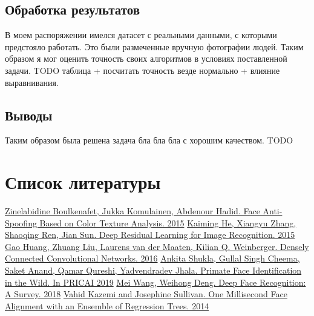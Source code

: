 \documentclass[a4paper,14pt]{extarticle}
\begin{document}
    \subsection{Обработка результатов}
    В моем распоряжении имелся датасет с реальными данными, с которыми предстояло работать. Это были размеченные вручную фотографии людей. Таким образом я мог оценить точность своих алгоритмов в условиях поставленной задачи. TODO таблица + посчитать точность везде нормально + влияние выравнивания.

    \subsection{Выводы}
    Таким образом была решена задача бла бла бла с хорошим качеством. TODO

    \newpage

	\section{Список литературы}
	\renewcommand{\section}[2]{}
    \begin{thebibliography}{0}
    	\hypertarget{lpb}{}
    	\href{https://arxiv.org/abs/1511.06316}
    	{Zinelabidine Boulkenafet, Jukka Komulainen, Abdenour Hadid. Face Anti-Spoofing Based on Color Texture Analysis. 2015}
        \hypertarget{resnet}{}
        \href{https://arxiv.org/abs/1512.03385}
        {Kaiming He, Xiangyu Zhang, Shaoqing Ren, Jian Sun. Deep Residual Learning for Image Recognition. 2015}
        \hypertarget{densenet}{}
        \href{https://arxiv.org/abs/1608.06993}
        {Gao Huang, Zhuang Liu, Laurens van der Maaten, Kilian Q. Weinberger. Densely Connected Convolutional Networks. 2016}
        \hypertarget{pfid}{}
        \href{https://arxiv.org/abs/1907.02642}
        {Ankita Shukla, Gullal Singh Cheema, Saket Anand, Qamar Qureshi, Yadvendradev Jhala. Primate Face Identification in the Wild. In PRICAI 2019}
        \hypertarget{face}{}
        \href{https://arxiv.org/abs/1804.06655}
        {Mei Wang, Weihong Deng. Deep Face Recognition: A Survey. 2018}
        \hypertarget{align}{}
        \href{http://www.csc.kth.se/~vahidk/papers/KazemiCVPR14.pdf}
        {Vahid Kazemi and Josephine Sullivan. One Millisecond Face Alignment with an Ensemble of Regression Trees. 2014}
    \end{thebibliography}
\end{document}
